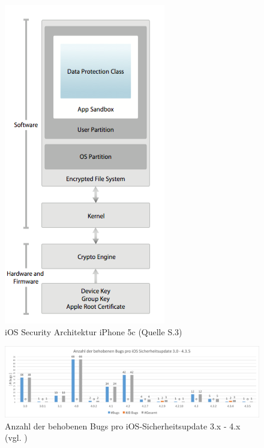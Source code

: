 \begin{figure}[htbp!]
    \centering 
		        \includegraphics[scale=0.3]{Bilder/SecArchitektur-iOS7.png}
	\caption {iOS Security Architektur iPhone 5c (Quelle \cite{Apple[9]} S.3) } 
    \label{fig:iOSSecurityArchitekturiOS7}
\end{figure}

\begin{figure}[htbp!]
        \centering
                \includegraphics[scale=0.4]{Bilder/iOSSicherheitsupdate3.png}
        \caption{Anzahl der behobenen Bugs pro iOS-Sicherheitsupdate 3.x - 4.x \newline (vgl. \cite{Apple[7]}) \protect\footnotemark}
        \label{fig:AnalyseiOSSicherheitsupdate3}
\end{figure}

